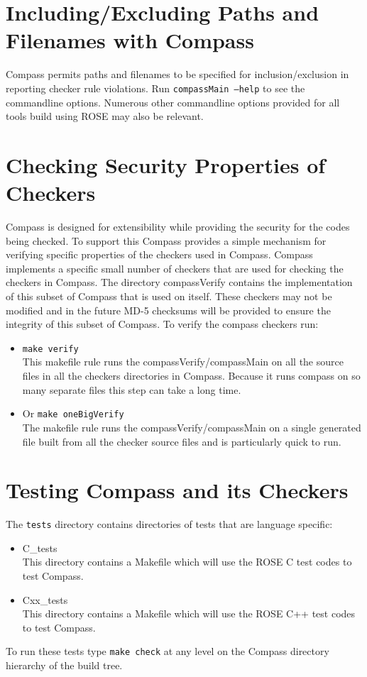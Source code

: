 \section{Including/Excluding Paths and Filenames with Compass}

    Compass permits paths and filenames to be specified for inclusion/exclusion
in reporting checker rule violations.  Run {\tt compassMain --help} to see
the commandline options.  Numerous other commandline options provided for all
tools build using ROSE may also be relevant.



\section{Checking Security Properties of Checkers}
\label{sec:compass_verify}

    Compass is designed for extensibility while providing the security for
the codes being checked.  To support this Compass provides a simple
mechanism for verifying specific properties of the checkers used in Compass.
Compass implements a specific small number of checkers that are used for checking
the checkers in Compass.  The directory compassVerify contains the implementation
of this subset of Compass that is used on itself.  These checkers may not
be modified and in the future MD-5 checksums will be provided to ensure the
integrity of this subset of Compass.  To verify the compass checkers run:
\begin{itemize}
   \item {\tt make verify} \\
        This makefile rule runs the compassVerify/compassMain on all the source files in
    all the checkers directories in Compass.  Because it runs compass on so
    many separate
    files this step can take a long time.
   \item Or {\tt make oneBigVerify} \\
        The makefile rule runs the compassVerify/compassMain on a single generated file
    built from all the checker source files and is particularly quick to run.
\end{itemize}



\section{Testing Compass and its Checkers}

   The {\tt tests} directory contains directories of tests that
are language specific:
\begin{itemize}
   \item C\_tests \\ 
         This directory contains a Makefile which will use the ROSE C test codes 
         to test Compass.
   \item Cxx\_tests \\ 
         This directory contains a Makefile which will use the ROSE C++ test codes 
         to test Compass.
\end{itemize}
To run these tests type {\tt make check} at any level on the Compass directory
hierarchy of the build tree.
\clearpage
